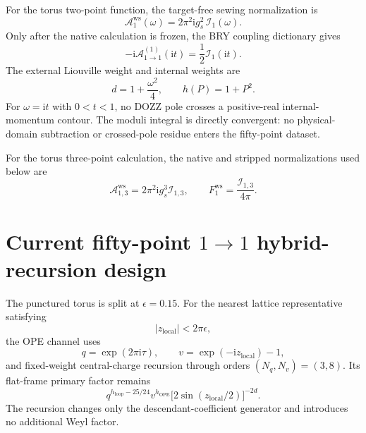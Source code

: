 \documentclass[11pt]{article}
\newcommand{\ii}{\mathrm{i}}
\newcommand{\A}{\mathcal{A}}
\newcommand{\cI}{\mathcal{I}}
\begin{document}
For the torus two-point function, the target-free sewing normalization is
\begin{equation}
 \boxed{
 \A^{\mathrm{ws}}_1(\omega)
 =2\pi^2\ii g_s^2\,\cI_1(\omega).}
 \label{eq:two-point-native}
\end{equation}
Only after the native calculation is frozen, the BRY coupling dictionary
gives~\cite{BRY}
\begin{equation}
 \boxed{
 -\ii\A_{1\to1}^{(1)}(\ii t)=\frac{1}{2}\cI_1(\ii t).}
 \label{eq:two-point-bry-map}
\end{equation}
The external Liouville weight and internal weights are
\begin{equation}
 d=1+\frac{\omega^2}{4},
 \qquad h(P)=1+P^2.
\end{equation}
For $\omega=\ii t$ with $0<t<1$, no DOZZ pole crosses a positive-real
internal-momentum contour.  The moduli integral is directly convergent: no
physical-domain subtraction or crossed-pole residue enters the fifty-point
dataset.

For the torus three-point calculation, the native and stripped normalizations
used below are
\begin{equation}
 \A^{\mathrm{ws}}_{1,3}
 =2\pi^2\ii g_s^3\cI_{1,3},
 \qquad
 F_1^{\mathrm{ws}}=\frac{\cI_{1,3}}{4\pi}.
 \label{eq:three-point-normalization}
\end{equation}

\section{Current fifty-point \texorpdfstring{$1\to1$}{1 to 1}
hybrid-recursion design}
\label{sec:two-point-design}

The punctured torus is split at $\epsilon=0.15$.  For the nearest lattice
representative satisfying
\begin{equation}
 |z_{\mathrm{local}}|<2\pi\epsilon,
\end{equation}
the OPE channel uses
\begin{equation}
 q=\exp(2\pi\ii\tau),
 \qquad
 v=\exp(-\ii z_{\mathrm{local}})-1,
 \label{eq:ope-coordinates}
\end{equation}
and fixed-weight central-charge recursion through orders
$(N_q,N_v)=(3,8)$.  Its flat-frame primary factor remains
\begin{equation}
 q^{h_{\mathrm{loop}}-25/24}v^{h_{\mathrm{OPE}}}
 \bigl[2\sin(z_{\mathrm{local}}/2)\bigr]^{-2d}.
 \label{eq:ope-primary-factor}
\end{equation}
The recursion changes only the descendant-coefficient generator and
introduces no additional Weyl factor.
\end{document}
